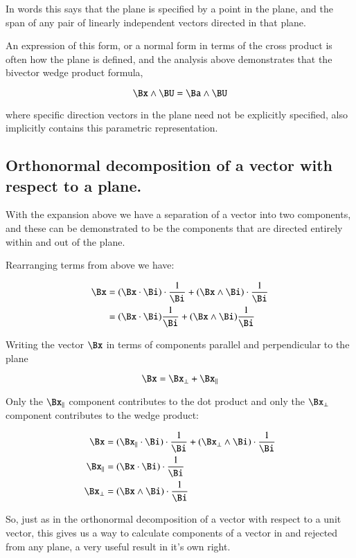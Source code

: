 In words this says that the plane is specified by a point in the plane,
and the span of any pair of linearly independent vectors directed in that plane.

An expression of this form, or a normal form in terms of the cross product
is often how the plane is defined, and the analysis above demonstrates
that the bivector wedge product formula,

\[
\Bx \wedge \BU = \Ba \wedge \BU
\]

where specific direction vectors in the plane need not be explicitly specified,
also implicitly contains this parametric representation.

\subsection{Orthonormal decomposition of a vector with respect to a plane. }

With the expansion above we have a separation of a vector into two
components, and these can be demonstrated to be the components that are
directed entirely within and out of the plane.

Rearranging terms from above we have:

\begin{align*}
\Bx 
&= 
(\Bx \cdot \Bi) \cdot \frac{1}{\Bi} + (\Bx \wedge \Bi) \cdot \frac{1}{\Bi} \\
&= 
(\Bx \cdot \Bi) \frac{1}{\Bi} + (\Bx \wedge \Bi) \frac{1}{\Bi} \\
\end{align*}

Writing the vector $\Bx$ in terms of components parallel and perpendicular
to the plane

\[
\Bx = \Bx_{\perp} + \Bx_{\parallel}
\]

Only the $\Bx_{\parallel}$ component contributes to the dot product
and only the $\Bx_{\perp}$ component contributes to the wedge product:

\begin{align*}
\Bx 
&= 
(\Bx_\parallel \cdot \Bi) \cdot \frac{1}{\Bi} + (\Bx_\perp \wedge \Bi) \cdot \frac{1}{\Bi} \\
\Bx_\parallel &= (\Bx \cdot \Bi) \cdot \frac{1}{\Bi} \\
\Bx_\perp &= (\Bx \wedge \Bi) \cdot \frac{1}{\Bi} \\
\end{align*}

So, just as in the orthonormal decomposition of a vector with respect to a
unit vector, this gives us a way to calculate components of a vector
in and rejected from any plane, a very useful result in it's own right.

